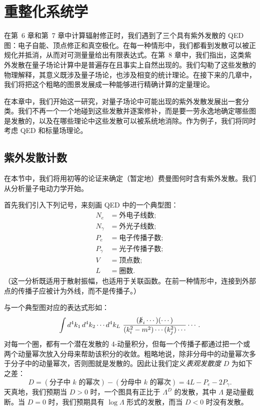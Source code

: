 \chapter{重整化系统学}

在第~6 章和第~7 章中计算辐射修正时，我们遇到了三个具有紫外发散的 QED 图：电子自能、顶点修正和真空极化。在每一种情形中，我们都看到发散可以被正规化并抵消，从而对可测量量给出有限表达式。在第~8 章中，我们指出，这类紫外发散在量子场论计算中是普遍存在且事实上自然出现的。我们勾勒了这些发散的物理解释，其意义既涉及量子场论，也涉及相变的统计理论。在接下来的几章中，我们将把这个粗略的图景发展成一种能够进行精确计算的定量理论。

在本章中，我们开始这一研究，对量子场论中可能出现的紫外发散发展出一套分类。我们不再一个一个地碰到这些发散并逐案修补，而是要一劳永逸地确定哪些图是发散的，以及在哪些理论中这些发散可以被系统地消除。作为例子，我们将同时考虑 QED 和标量场理论。

\section{紫外发散计数}

在本节中，我们将用初等的论证来确定（暂定地）费曼图何时含有紫外发散。我们从分析量子电动力学开始。

首先我们引入下列记号，来刻画 QED 中的一个典型图：
\begin{equation}
  \begin{aligned}
    N_e &= \text{外电子线数};\\
    N_\gamma &= \text{外光子线数};\\
    P_e &= \text{电子传播子数};\\
    P_\gamma &= \text{光子传播子数};\\
    V &= \text{顶点数};\\
    L &= \text{圈数}.
  \end{aligned}
\end{equation}
（这一分析既适用于散射振幅，也适用于关联函数。在前一种情形中，连接到外部点的传播子应被计为外线，而不是传播子。）

与一个典型图对应的表达式形如：
\begin{equation}
  \int d^4k_1\,d^4k_2\cdots d^4k_L\
    \frac{(\slashed{k}_i\cdots)(\cdots)}{(k_i^2-m^2)\cdots(k_j^2)\cdots}
    \cdots .
\end{equation}
对每一个圈，都有一个潜在发散的 4-动量积分，但每一个传播子都通过把一个或两个动量幂次放入分母来帮助该积分的收敛。粗略地说，除非分母中的动量幂次多于分子中的动量幂次，否则图就是发散的。因此让我们定义\emph{表观发散度} $D$ 为如下之差：
\begin{equation}
  D = (\text{分子中 }k\text{ 的幂次}) - (\text{分母中 }k
    \text{ 的幂次}) = 4L - P_e - 2P_\gamma .
  \label{eq:10.1}
\end{equation}
天真地，我们预期当 $D > 0$ 时，一个图具有正比于 $\Lambda^D$ 的发散，其中 $\Lambda$ 是动量截断。当 $D = 0$ 时，我们预期具有 $\log\Lambda$ 形式的发散，而当 $D < 0$ 时没有发散。

